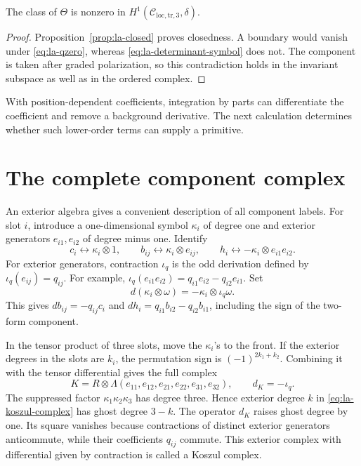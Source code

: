 \begin{proposition}\label{prop:la-tr-nonexact}
The class of $\Theta$ is nonzero in
$H^1(\mathcal C_{\mathrm{loc,tr},3},\delta)$.
\end{proposition}
\begin{proof}
Proposition~\ref{prop:la-closed} proves closedness.
A boundary would vanish under \eqref{eq:la-qzero}, whereas
\eqref{eq:la-determinant-symbol} does not. The component is
taken after graded polarization, so this contradiction holds
in the invariant subspace as well as in the ordered complex.
\end{proof}

With position-dependent coefficients, integration by parts
can differentiate the coefficient and remove a background
derivative. The next calculation determines whether such
lower-order terms can supply a primitive.

\section{The complete component complex}
\label{sec:la-koszul}

An exterior algebra gives a convenient description of all
component labels. For slot $i$, introduce a one-dimensional
symbol $\kappa_i$ of degree one and exterior generators
$e_{i1},e_{i2}$ of degree minus one. Identify
\begin{equation}\label{eq:la-slot-identification}
 c_i\longleftrightarrow\kappa_i\otimes1,\qquad
 b_{ij}\longleftrightarrow\kappa_i\otimes e_{ij},\qquad
 h_i\longleftrightarrow-\kappa_i\otimes e_{i1}e_{i2}.
\end{equation}
For exterior generators, contraction $\iota_q$ is the odd
derivation defined by $\iota_q(e_{ij})=q_{ij}$.
For example,
$\iota_q(e_{i1}e_{i2})=q_{i1}e_{i2}-q_{i2}e_{i1}$.
Set
\[
 d(\kappa_i\otimes\omega)
       =-\kappa_i\otimes\iota_q\omega.
\]
This gives $d b_{ij}=-q_{ij}c_i$ and
$d h_i=q_{i1}b_{i2}-q_{i2}b_{i1}$, including the sign of the
two-form component.

In the tensor product of three slots, move the $\kappa_i$'s to
the front. If the exterior degrees in the slots are $k_i$, the
permutation sign is $(-1)^{2k_1+k_2}$. Combining it with the
tensor differential gives the full complex
\begin{equation}\label{eq:la-koszul-complex}
 K=R\otimes\Lambda(e_{11},e_{12},e_{21},e_{22},e_{31},e_{32}),
 \qquad d_K=-\iota_q.
\end{equation}
The suppressed factor $\kappa_1\kappa_2\kappa_3$ has degree
three. Hence exterior degree $k$ in \eqref{eq:la-koszul-complex}
has ghost degree $3-k$. The operator $d_K$ raises ghost degree
by one. Its square vanishes because contractions of distinct
exterior generators anticommute, while their coefficients
$q_{ij}$ commute. This exterior complex with differential given
by contraction is called a Koszul complex.

